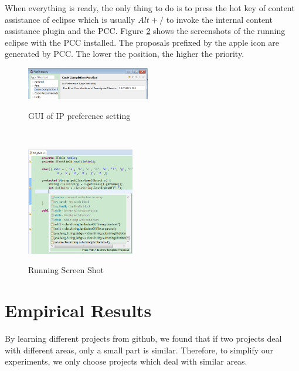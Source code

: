 \documentclass{sig-alternate-05-2015}
\begin{document}
When everything is ready, the only thing to do is to press the hot key of content assistance of eclipse which is usually $Alt+/$ to invoke the internal content assistance plugin and the PCC. Figure \ref{codecomprunexample} shows the screenshots of the running eclipse with the PCC installed. The proposals prefixed by the apple icon are generated by PCC. The lower the position, the higher the priority.
\vspace{-0.2cm}
\\\begin{figure}[htbp]
  \centering
  \includegraphics[width=0.48\textwidth]{pics/preferencesetting.png}\\
  \caption{GUI of IP preference setting}\label{GUIpreference}
\end{figure}
\vspace{-0.5cm}
\\\begin{figure}[htbp]
  \centering
  \includegraphics[width=0.42\textwidth]{pics/codecomprunexample.png}\\
  \caption{Running Screen Shot}\label{codecomprunexample}
\end{figure}
\vspace{-0.1cm}

\section{Empirical Results}

By learning different projects from github, we found that if two projects deal with different areas, only a small part is similar. Therefore, to simplify our experiments, we only choose projects which deal with similar areas.
\end{document}
